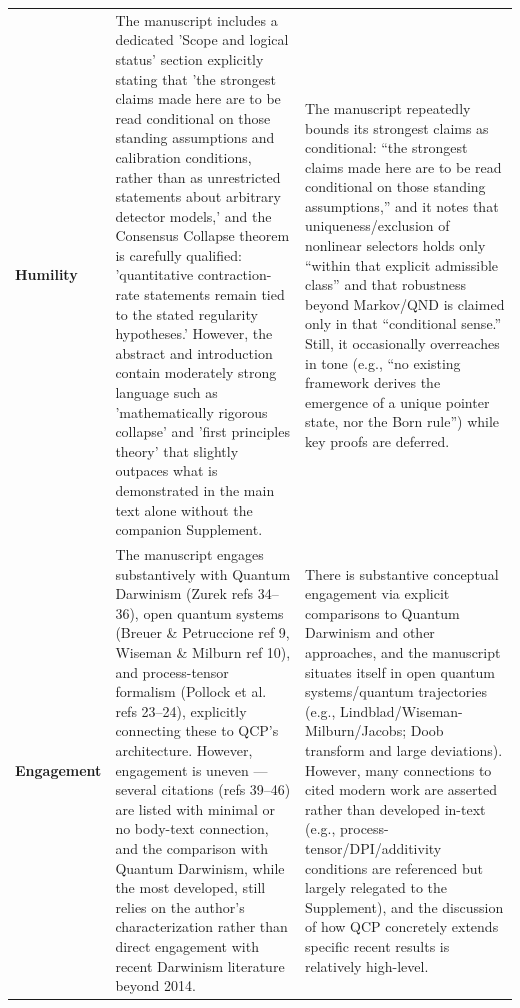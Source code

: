 \documentclass[11pt]{article}
\begin{document}
\begin{longtable}{@{} p{2.2cm} p{6.3cm} p{6.3cm} @{}}
\rowcolor{rowgray}
\textbf{Humility} &
The manuscript includes a dedicated 'Scope and logical status' section explicitly stating that 'the strongest claims made here are to be read conditional on those standing assumptions and calibration conditions, rather than as unrestricted statements about arbitrary detector models,' and the Consensus Collapse theorem is carefully qualified: 'quantitative contraction-rate statements remain tied to the stated regularity hypotheses.' However, the abstract and introduction contain moderately strong language such as 'mathematically rigorous collapse' and 'first principles theory' that slightly outpaces what is demonstrated in the main text alone without the companion Supplement. &
The manuscript repeatedly bounds its strongest claims as conditional: “the strongest claims made here are to be read conditional on those standing assumptions,” and it notes that uniqueness/exclusion of nonlinear selectors holds only “within that explicit admissible class” and that robustness beyond Markov/QND is claimed only in that “conditional sense.” Still, it occasionally overreaches in tone (e.g., “no existing framework derives the emergence of a unique pointer state, nor the Born rule”) while key proofs are deferred. \\[6pt]

\textbf{Engagement} &
The manuscript engages substantively with Quantum Darwinism (Zurek refs 34–36), open quantum systems (Breuer \& Petruccione ref 9, Wiseman \& Milburn ref 10), and process-tensor formalism (Pollock et al. refs 23–24), explicitly connecting these to QCP's architecture. However, engagement is uneven — several citations (refs 39–46) are listed with minimal or no body-text connection, and the comparison with Quantum Darwinism, while the most developed, still relies on the author's characterization rather than direct engagement with recent Darwinism literature beyond 2014. &
There is substantive conceptual engagement via explicit comparisons to Quantum Darwinism and other approaches, and the manuscript situates itself in open quantum systems/quantum trajectories (e.g., Lindblad/Wiseman-Milburn/Jacobs; Doob transform and large deviations). However, many connections to cited modern work are asserted rather than developed in-text (e.g., process-tensor/DPI/additivity conditions are referenced but largely relegated to the Supplement), and the discussion of how QCP concretely extends specific recent results is relatively high-level. \\[6pt]


\end{longtable}
\end{document}
